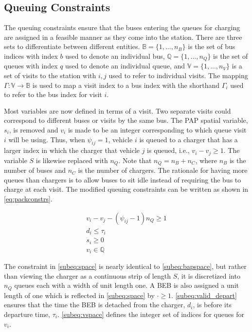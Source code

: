\documentclass[utf8]{FrontiersinHarvard}
\begin{document}
\subsection{Queuing Constraints}
\label{sec:queuing}
\noindent
The queuing constraints ensure that the buses entering the queues for charging are assigned in a feasible manner as
they come into the station. There are three sets to differentiate between different entities. \(\mathbb{B} = \{1, ...,
n_B\}\) is the set of bus indices with index \(b\) used to denote an individual bus, \(\mathbb{Q} = \{1, ..., n_Q\}\) is the set of
queues with index \(q\) used to denote an individual queue, and \(\mathbb{V} = \{1, ..., n_V\}\) is a set of visits to the
station with \(i,j\) used to refer to individual visits. The mapping \(\Gamma: \mathbb{V} \rightarrow \mathbb{B}\) is used to map a visit
index to a bus index with the shorthand \(\Gamma_i\) used to refer to the bus index for visit \(i\).

Most variables are now defined in terms of a visit. Two separate visits could correspond to different buses or visits by
the same bus. The PAP spatial variable, \(s_i\), is removed and \(v_i\) is made to be an integer corresponding to which
queue visit \(i\) will be using. Thus, when \(\psi_{ij} = 1\), vehicle \(i\) is queued to a charger that has a larger index in
which the charger that vehicle \(j\) is queued, i.e., \(v_i-v_j \geq 1\). The variable \(S\) is likewise replaced with \(n_Q\).
Note that \(n_Q = n_B + n_C\), where \(n_B\) is the number of buses and \(n_C\) is the number of chargers. The rationale for
having more queues than chargers is to allow buses to sit idle instead of requiring the bus to charge at each visit. The
modified queuing constraints can be written as shown in \autoref{eq:packconstrs}.

\begin{subequations}
\label{eq:packconstrs}
\begin{align}
    v_i - v_j - (\psi_{ij} - 1)n_Q \geq 1       \label{subeq:space}        \\
    d_i \leq \tau_i                             \label{subeq:valid_depart} \\
    s_i \geq 0                               \label{subeq:pos_charge} \\
    v_i \in \mathbb{Q}                       \label{subeq:vspace}
\end{align}
\end{subequations}

The constraint in \autoref{subeq:space} is nearly identical to \autoref{subeq:bapspace}, but rather than viewing the
charger as a continuous strip of length \(S\), it is discretized into \(n_Q\) queues each with a width of unit length one. A
BEB is also assigned a unit length of one which is reflected in \autoref{subeq:space} by \(\cdot \geq 1\).
\autoref{subeq:valid_depart} ensures that the time the BEB is detached from the charger, \(d_i\), is before its departure
time, \(\tau_i\). \autoref{subeq:vspace} defines the integer set of indices for queues for \(v_i\).
\end{document}
